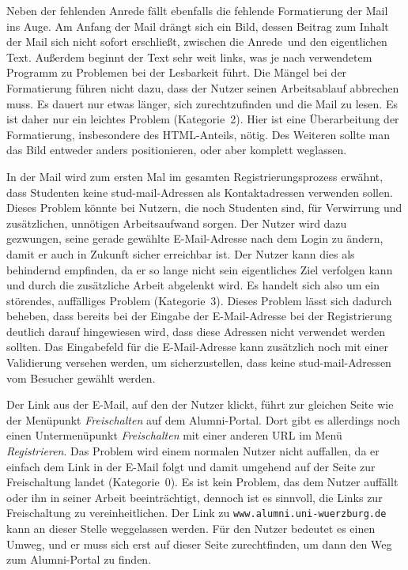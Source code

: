 {
Neben der fehlenden Anrede fällt ebenfalls die fehlende Formatierung der Mail ins Auge. Am Anfang der Mail drängt sich ein Bild, dessen Beitrag zum Inhalt der Mail sich nicht sofort erschließt, zwischen die \glqq Anrede\grqq ~und den eigentlichen Text. Außerdem beginnt der Text sehr weit links, was je nach verwendetem Programm zu Problemen bei der Lesbarkeit führt.
}
{
Die Mängel bei der Formatierung führen nicht dazu, dass der Nutzer seinen Arbeitsablauf abbrechen muss. Es dauert nur etwas länger, sich zurechtzufinden und die Mail zu lesen. Es ist daher nur ein leichtes Problem (Kategorie~2).
}
{
Hier ist eine Überarbeitung der Formatierung, insbesondere des HTML-Anteils, nötig. Des Weiteren sollte man das Bild entweder anders positionieren, oder aber komplett weglassen.
}
\label{prob:frei:mailformat}

{
In der Mail wird zum ersten Mal im gesamten Registrierungsprozess erwähnt, dass Studenten keine stud\hbox{-}mail-Adressen als Kontaktadressen verwenden sollen.
}
{
Dieses Problem könnte bei Nutzern, die noch Studenten sind, für Verwirrung und zusätzlichen, unnötigen Arbeitsaufwand sorgen. Der Nutzer wird dazu gezwungen, seine gerade gewählte E\hbox{-}Mail-Adresse nach dem Login zu ändern, damit er auch in Zukunft sicher erreichbar ist. Der Nutzer kann dies als behindernd empfinden, da er so lange nicht sein eigentliches Ziel verfolgen kann und durch die zusätzliche Arbeit abgelenkt wird. Es handelt sich also um ein störendes, auffälliges Problem (Kategorie~3).
}
{
Dieses Problem lässt sich dadurch beheben, dass bereits bei der Eingabe der E\hbox{-}Mail-Adresse bei der Registrierung deutlich darauf hingewiesen wird, dass diese Adressen nicht verwendet werden sollten. Das Eingabefeld für die E\hbox{-}Mail-Adresse kann zusätzlich noch mit einer Validierung versehen werden, um sicherzustellen, dass keine stud\hbox{-}mail-Adressen vom Besucher gewählt werden.
}
\label{prob:frei:studmail}

{
Der Link aus der E\hbox{-}Mail, auf den der Nutzer klickt, führt zur gleichen Seite wie der Menüpunkt \emph{Freischalten} auf dem Alumni-Portal. Dort gibt es allerdings noch einen Untermenüpunkt \emph{Freischalten} mit einer anderen URL im Menü  \emph{ Registrieren}.
}
{
Das Problem wird einem normalen Nutzer nicht auffallen, da er einfach dem Link in der E\hbox{-}Mail folgt und damit umgehend auf der Seite zur Freischaltung landet (Kategorie~0).
}
{
Es ist kein Problem, das dem Nutzer auffällt oder ihn in seiner Arbeit beeinträchtigt, dennoch ist es sinnvoll, die Links zur Freischaltung zu vereinheitlichen. Der Link zu \texttt{www.alumni.uni-wuerzburg.de} kann an dieser Stelle weggelassen werden. Für den Nutzer bedeutet es einen Umweg, und er muss sich erst auf dieser Seite zurechtfinden, um dann den Weg zum Alumni-Portal zu finden.
}
\label{prob:frei:link}

